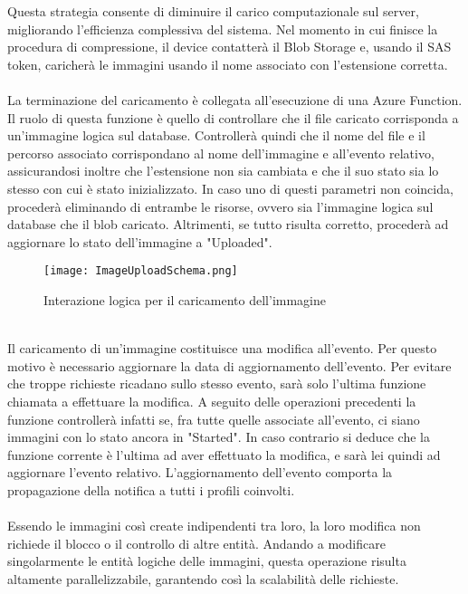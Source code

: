 Questa strategia consente di diminuire il carico computazionale sul server, 
migliorando l’efficienza complessiva del sistema.
Nel momento in cui finisce la procedura di compressione, il device contatterà il Blob Storage e,
usando il SAS token, caricherà le immagini usando il nome associato con l'estensione corretta.\\
\\
La terminazione del caricamento è collegata all'esecuzione di una Azure Function.
Il ruolo di questa funzione è quello di controllare che il file caricato corrisponda
a un'immagine logica sul database.
Controllerà quindi che il nome del file e il percorso associato corrispondano 
al nome dell'immagine e all'evento relativo, 
assicurandosi inoltre che l'estensione non sia cambiata 
e che il suo stato sia lo stesso con cui è stato inizializzato.
In caso uno di questi parametri non coincida, 
procederà eliminando di entrambe le risorse, 
ovvero sia l'immagine logica sul database che il blob caricato.
Altrimenti, se tutto risulta corretto,
procederà ad aggiornare lo stato dell'immagine a "Uploaded".\\
\begin{figure}[h!]
    \centering
    \texttt{[image: ImageUploadSchema.png]}
    \caption{Interazione logica per il caricamento dell'immagine}
\end{figure}
\\
Il caricamento di un'immagine costituisce una modifica all'evento.
Per questo motivo è necessario aggiornare la data di aggiornamento dell'evento.
Per evitare che troppe richieste ricadano sullo stesso evento,
sarà solo l'ultima funzione chiamata a effettuare la modifica.
A seguito delle operazioni precedenti la funzione controllerà infatti se, 
fra tutte quelle associate all'evento, ci siano immagini con lo stato ancora in "Started".
In caso contrario si deduce che la funzione corrente è l'ultima ad aver effettuato la modifica,
e sarà lei quindi ad aggiornare l'evento relativo.
L'aggiornamento dell'evento comporta la propagazione della notifica a tutti i profili coinvolti.\\
\\
Essendo le immagini così create indipendenti tra loro,
la loro modifica non richiede il blocco o il controllo di altre entità.
Andando a modificare singolarmente le entità logiche delle immagini,
questa operazione risulta altamente parallelizzabile,
garantendo così la scalabilità delle richieste.\\
\\
